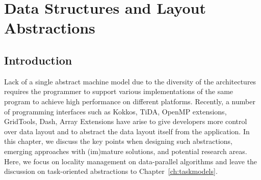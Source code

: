 \chapter{Data Structures and Layout Abstractions}
\label{ch:datastructures}





\section{Introduction}


Lack of a single abstract machine model  due to the diversity of the architectures 
requires the programmer to support various implementations of the same program to achieve high performance
on different platforms. Recently, a number of programming interfaces such as Kokkos, TiDA, OpenMP
extensions, GridTools, Dash, Array Extensions \cite{all} have arise to give developers more control over 
 data layout and to abstract the data layout itself from the application. 
 In this chapter, we discuss the key points when designing such abstractions, emerging approaches with (im)mature
 solutions, and potential research areas. Here, we focus on  locality management on data-parallel algorithms 
 and leave the discussion on task-oriented abstractions to Chapter~\ref{ch:taskmodels}.



